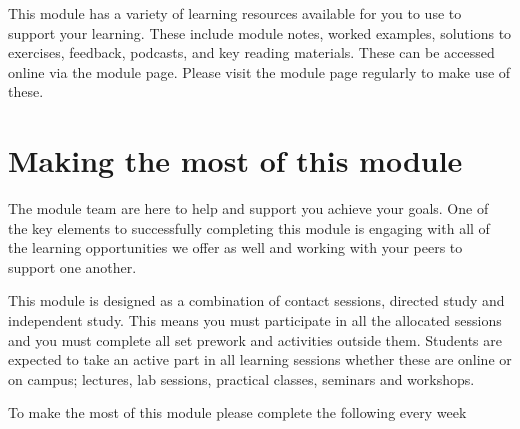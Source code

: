 \documentclass{MDXHandbook}
\begin{document}

This module has a variety of learning resources available for you to use to support your learning. These include module notes, worked examples, solutions to exercises, feedback, podcasts, and key reading materials. These can be accessed online via the module page. Please visit the module page regularly to make use of these. 


\section{Making the most of this module}

The module team are here to help and support you achieve your goals. One of the key elements to successfully completing this module is engaging with all of the learning opportunities we offer as well and working with your peers to support one another.  


This module is designed as a combination of contact sessions, directed study and independent study. This means you must participate in all the allocated sessions and you must complete all set prework and activities outside them. Students are expected to take an active part in all learning sessions whether these are online or on campus; lectures, lab sessions, practical classes, seminars and workshops.  

To make the most of this module please complete the following every week 
\end{document}
